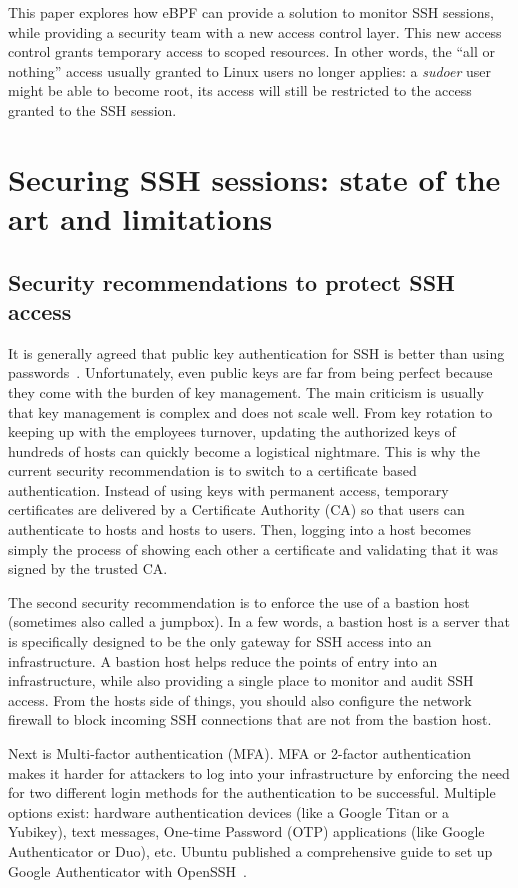 This paper explores how eBPF can provide a solution to monitor SSH sessions, while providing a security team with a new access control layer.
This new access control grants temporary access to scoped resources.
In other words, the “all or nothing” access usually granted to Linux users no longer applies: a \emph{sudoer} user might be able to become root, its access will still be restricted to the access granted to the SSH session.

\section{Securing SSH sessions: state of the art and limitations}

\subsection{Security recommendations to protect SSH access}

It is generally agreed that public key authentication for SSH is better than using passwords~\cite{MonitoringAndProtectingSSHSessionsWithEBPF:Facebook}.
Unfortunately, even public keys are far from being perfect because they come with the burden of key management.
The main criticism is usually that key management is complex and does not scale well.
From key rotation to keeping up with the employees turnover, updating the authorized keys of hundreds of hosts can quickly become a logistical nightmare.
This is why the current security recommendation is to switch to a certificate based authentication.
Instead of using keys with permanent access, temporary certificates are delivered by a Certificate Authority (CA) so that users can authenticate to hosts and hosts to users.
Then, logging into a host becomes simply the process of showing each other a certificate and validating that it was signed by the trusted CA.

The second security recommendation is to enforce the use of a bastion host (sometimes also called a jumpbox).
In a few words, a bastion host is a server that is specifically designed to be the only gateway for SSH access into an infrastructure.
A bastion host helps reduce the points of entry into an infrastructure, while also providing a single place to monitor and audit SSH access.
From the hosts side of things, you should also configure the network firewall to block incoming SSH connections that are not from the bastion host.

Next is Multi-factor authentication (MFA).
MFA or 2-factor authentication makes it harder for attackers to log into your infrastructure by enforcing the need for two different login methods for the authentication to be successful.
Multiple options exist: hardware authentication devices (like a Google Titan or a Yubikey), text messages, One-time Password (OTP) applications (like Google Authenticator or Duo), etc.
Ubuntu published a comprehensive guide to set up Google Authenticator with OpenSSH~\cite{MonitoringAndProtectingSSHSessionsWithEBPF:Ubuntu2FA}.

